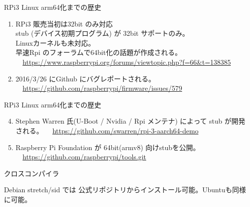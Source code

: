 \begin{frame}{RPi3 Linux arm64化までの歴史}

\begin{enumerate}[<+->]
\item RPi3 販売当初は32bit のみ対応 \\
   stub (デバイス初期プログラム) が 32bit サポートのみ。\\
   Linuxカーネルも未対応。\\
   早速Rpi のフォーラムで64bit化の話題が作成される。\\
   \ \ {\tiny \url{https://www.raspberrypi.org/forums/viewtopic.php?f=66&t=138385}}

\item 2016/3/26 にGithub にバグレポートされる。\\
   \ \ {\tiny \url{https://github.com/raspberrypi/firmware/issues/579}}
\end{enumerate}
\end{frame}

\begin{frame}{RPi3 Linux arm64化までの歴史}
\begin{enumerate}
\setcounter{enumi}{3}
\item Stephen Warren 氏(U-Boot / Nvidia / Rpi メンテナ) によって stub が開発される。
   \ \ {\tiny \url{https://github.com/swarren/rpi-3-aarch64-demo}}

\item Raspberry Pi Foundation が 64bit(armv8) 向けstubを公開。 \\
   \ \ {\tiny \url{https://github.com/raspberrypi/tools.git}}

\end{enumerate}
\end{frame}


\begin{frame}[containsverbatim]{クロスコンパイラ}

Debian stretch/sid では 公式リポジトリからインストール可能。Ubuntuも同様に可能。


\end{frame}

